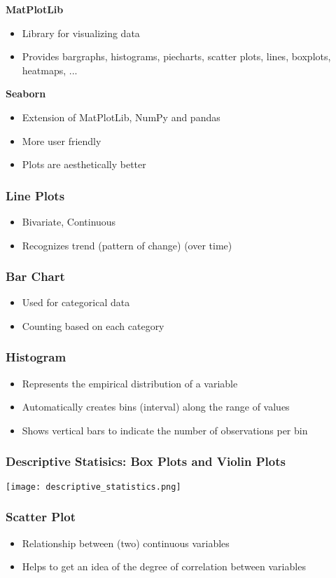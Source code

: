 \textbf{MatPlotLib}
\begin{itemize}
    \item Library for visualizing data
    \item Provides bargraphs, histograms, piecharts, scatter plots, lines, boxplots, heatmaps, ...
\end{itemize}

\textbf{Seaborn}
\begin{itemize}
    \item Extension of MatPlotLib, NumPy and pandas
    \item More user friendly
    \item Plots are aesthetically better
\end{itemize}

\subsubsection{Line Plots}
\begin{itemize}
    \item Bivariate, Continuous
    \item Recognizes trend (pattern of change) (over time)
\end{itemize}
\subsubsection{Bar Chart}
\begin{itemize}
    \item Used for categorical data
    \item Counting based on each category
\end{itemize}
\subsubsection{Histogram}
\begin{itemize}
    \item Represents the empirical distribution of a variable
    \item Automatically creates bins (interval) along the range of values
    \item Shows vertical bars to indicate the number of observations per bin
\end{itemize}
\subsubsection{Descriptive Statisics: Box Plots and Violin Plots}
\texttt{[image: descriptive\_statistics.png]}
\subsubsection{Scatter Plot}
\begin{itemize}
    \item Relationship between (two) continuous variables
    \item Helps to get an idea of the degree of correlation between variables
\end{itemize}
